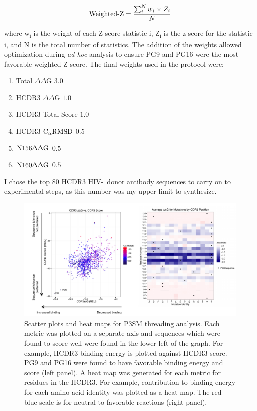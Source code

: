 \begin{gather*}
\textup{Weighted-Z} = \frac{\sum_{i}^{N}w_{i}\times Z_{i}}{N}
\end{gather*}

\noindent where w\textsubscript{i} is the weight of each Z-score statistic i, Z\textsubscript{i} is the z score for the statistic i, and N is the total number of statistics. The addition of the weights allowed optimization during \textit{ad hoc} analysis to ensure PG9 and PG16 were the most favorable weighted Z-score. The final weights used in the protocol were:
\begin{enumerate}
\setlength{\itemsep}{0pt}
\setlength{\parskip}{0pt}
\setlength{\parsep}{0pt}
\item Total $\Delta\Delta$G \textemdash{}  $3.0$
\item HCDR3 $\Delta\Delta$G \textemdash{}  $1.0$
\item HCDR3 Total Score \textemdash{}  $1.0$
\item HCDR3 $\textup{C}_{\alpha} \textup{RMSD}$ \textemdash{}  $0.5$
\item $\textup{N156} \Delta \Delta \textup{G}$ \textemdash{}  $0.5$
\item $\textup{N160} \Delta \Delta \textup{G}$ \textemdash{}  $0.5$
\end{enumerate}

\noindent I chose the top 80 HCDR3 HIV-\naive~donor antibody sequences to carry on to experimental steps, as this number was my upper limit to synthesize.

\begin{figure}
   \centering
   \includegraphics[width=\linewidth]{images/chapter3/figure3_11.pdf} %
   \caption[Scatter Plots and Heat Maps for P3SM Threading Analysis]{Scatter plots and heat maps for P3SM threading analysis. Each metric was plotted on a separate axis and sequences which were found to score well were found in the lower left of the graph. For example, HCDR3 binding energy is plotted against HCDR3 score. PG9 and PG16 were found to have favorable binding energy and score (left panel). A heat map was generated for each metric for residues in the HCDR3. For example, contribution to binding energy for each amino acid identity was plotted as a heat map. The red-blue scale is for neutral to favorable reactions (right panel).}
   \label{fig:figure3_11}
\end{figure}

